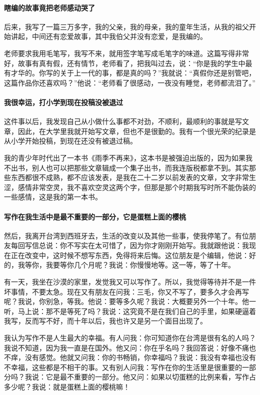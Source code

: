 \paragraph*{瞎编的故事竟把老师感动哭了}
\par 后来，我写了一篇三万多字，我的父亲，我的母亲，我的童年生活，从我的祖父开始讲起，中间还有恋爱故事，其中我伯父并没有恋爱，是我编的。
\par 老师要求我用毛笔写，我写不来，就用签字笔写成毛笔字的味道。这篇写得非常好，故事有真有假，还有情节，老师看了，把我叫过去，说：“你是我的学生中最有才华的。你写的关于上一代的事，都是真的吗？”我就说：“真假你还是别管吧，这篇作品你还喜欢吗？”他说：“老师看了很感动，一夜没有睡觉，老师都流泪了。”



\paragraph*{我很幸运，打小学到现在投稿没被退过}
\par 这件事以后，我发现自己从小做什么事都不对劲，不顺利，最顺利的事就是写文章，因此，在大学里我就开始写文章，但也不是很勤的。我有一个很光荣的纪录是从小学开始投稿，到现在还没有被退过稿。
\par 我的青少年时代出了一本书《雨季不再来》，这本书是被强迫出版的，因为如果我不出书，别人也可以把那些文章辑成一个集子出书，而我连版税都拿不到。其实那些东西都很不成熟，都不应该发表，是我在二十二岁以前发表的文章，文字非常生涩，感情非常空灵，我不喜欢空灵这两个字，但那是那个时期我写时所不能伪装的一些感情，这是我的第一本书。


\paragraph*{写作在我生活中是最不重要的一部分，它是蛋糕上面的樱桃}
\par 然后，我离开台湾到西班牙去，生活的改变以及其他一些事，使我停笔了。有位朋友每回写信总说：你不写实在太可惜了，因为你才刚刚开始写。我就跟他说：我现在正在改变中，这时候不想写东西，免得将来后悔。这位朋友是个编辑，他说：好的，我等你，我要等你几个月呢？我说：你慢慢地等。这一等，等了十年。
\par 有一天，我坐在沙漠的家里，发觉我又可以写作了。所以，我觉得等待并不是一件坏事情，不要太急。现在又有朋友在问我：三毛，你又不写了，要多久才会再写呢？我说，你别急，等我。他说：要等多久呢？我说：大概要另外一个十年。他一听，马上说：那不是等死了吗？我说：这究竟不是在我们自己的手里，如果硬逼着我写，反而写不好，而十年以后，我也许又是另一个面目出现了。
\par 我认为写作不是人生最大的幸福。有人问我：你可知道你在台湾是很有名的人吗？我说不知道，因为我一直是在国外。他又问：你在乎名吗？我回答说：好像不痛也不痒，没有感觉。他就又问我：你的书畅销，你幸福吗？我说：我没有幸福也没有不幸福，这些都是不相干的事。又有别人问我：写作在你的生活里是很重要的一部分吗？我说：它是最不重要的一部分。他又问：如果以切蛋糕的比例来看，写作占多少呢？我说：就是蛋糕上面的樱桃嘛！

